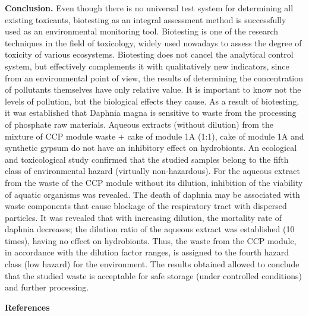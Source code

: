 \begin{multicols}{2}
{\bfseries Conclusion.} Even though there is no universal test system for
determining all existing toxicants, biotesting as an integral assessment
method is successfully used as an environmental monitoring tool.
Biotesting is one of the research techniques in the field of toxicology,
widely used nowadays to assess the degree of toxicity of various
ecosystems. Biotesting does not cancel the analytical control system,
but effectively complements it with qualitatively new indicators, since
from an environmental point of view, the results of determining the
concentration of pollutants themselves have only relative value. It is
important to know not the levels of pollution, but the biological
effects they cause. As a result of biotesting, it was established that
Daphnia magna is sensitive to waste from the processing of phosphate raw
materials. Aqueous extracts (without dilution) from the mixture of CCP
module waste + cake of module 1A (1:1), cake of module 1A and synthetic
gypsum do not have an inhibitory effect on hydrobionts. An ecological
and toxicological study confirmed that the studied samples belong to the
fifth class of environmental hazard (virtually non-hazardous). For the
aqueous extract from the waste of the CCP module without its dilution,
inhibition of the viability of aquatic organisms was revealed. The death
of daphnia may be associated with waste components that cause blockage
of the respiratory tract with dispersed particles. It was revealed that
with increasing dilution, the mortality rate of daphnia decreases; the
dilution ratio of the aqueous extract was established (10 times), having
no effect on hydrobionts. Thus, the waste from the CCP module, in
accordance with the dilution factor ranges, is assigned to the fourth
hazard class (low hazard) for the environment. The results obtained
allowed to conclude that the studied waste is acceptable for safe
storage (under controlled conditions) and further processing.
\end{multicols}

\begin{center}
{\bfseries References}
\end{center}

